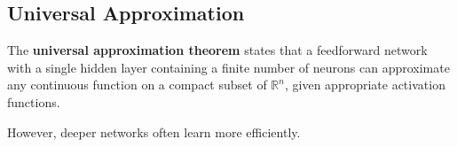 \subsection{Universal Approximation}

The \textbf{universal approximation theorem} states that a feedforward network with a single hidden layer containing a finite number of neurons can approximate any continuous function on a compact subset of $\mathbb{R}^n$, given appropriate activation functions.

However, deeper networks often learn more efficiently.


